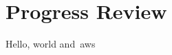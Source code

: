 
\thispagestyle{plain}
\newpage
\section{Progress Review}\label{sec:progress-review}

\normalsize
Hello, world and~\gls{aws} ~\citep{cc_overview}